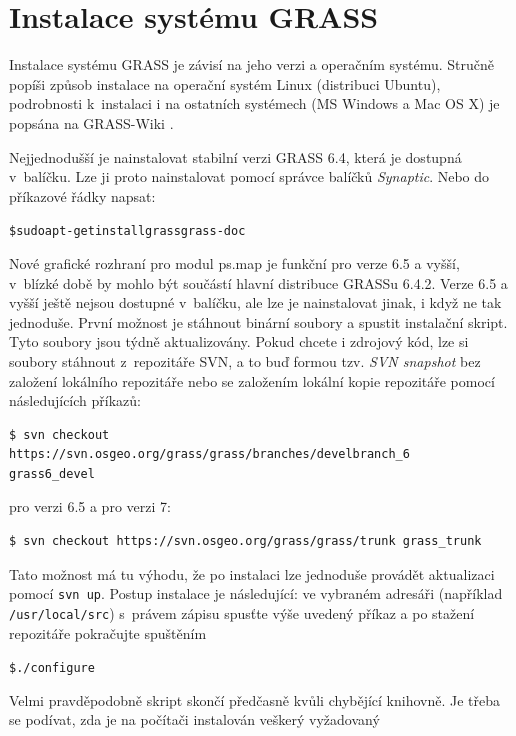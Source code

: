 \documentclass[a4paper,12pt,draft]{article}
\newif\ifbc %
\begin{document}
\newpage
\appendix
\pagestyle{plain}
\ifbc
\section{Instalace systému GRASS}
\label{priloha:instalace}
Instalace systému GRASS je závisí na jeho verzi a operačním
systému. Stručně popíši způsob instalace na operační systém Linux
(distribuci Ubuntu), podrobnosti k~instalaci i na ostatních systémech
(MS Windows a Mac OS X) je popsána na GRASS-Wiki \cite{instalace}.

Nejjednodušší je nainstalovat stabilní verzi GRASS 6.4, která je
dostupná v~ba\-líčku. Lze ji proto nainstalovat pomocí správce balíčků
\emph{Synaptic}. Nebo do příkazové řádky napsat:
\begin{alltt}
{\footnotesize \$ sudo apt-get install grass grass-doc}
\end{alltt}

Nové grafické rozhraní pro modul ps.map je funkční pro verze 6.5
a vyšší, v~blízké době by mohlo být součástí hlavní distribuce GRASSu 6.4.2.
Verze 6.5 a vyšší ještě nejsou dostupné v~balíčku, ale lze je nainstalovat
jinak,
i když ne tak jednoduše. První možnost je stáhnout binární soubory  a
spustit instalační skript. Tyto soubory jsou týdně aktualizovány. Pokud
chcete i zdrojový kód, lze si soubory stáhnout z~repozitáře SVN, a to buď
formou tzv. \emph{SVN snapshot} bez založení lokálního repozitáře nebo
se založením lokální kopie repozitáře pomocí následujících příkazů:
\begin{footnotesize}
\begin{verbatim}
$ svn checkout https://svn.osgeo.org/grass/grass/branches/develbranch_6
grass6_devel
\end{verbatim}
\end{footnotesize}
pro verzi 6.5 a pro verzi 7:
\begin{footnotesize}
\begin{verbatim}
$ svn checkout https://svn.osgeo.org/grass/grass/trunk grass_trunk
\end{verbatim}
\end{footnotesize}
Tato možnost má tu výhodu, že po instalaci lze jednoduše provádět
aktualizaci pomocí \verb|svn up|. Postup instalace je následující: ve
vybraném adresáři (například \verb|/usr/local/src|) s~právem zápisu
spusťte výše uvedený příkaz a po stažení repozitáře pokračujte
spuštěním
\begin{alltt}
{\footnotesize \$ ./configure}
\end{alltt}
Velmi pravděpodobně skript skončí předčasně
kvůli chybějící knihovně. Je třeba se podívat,
zda je na počítači instalován veškerý vyžadovaný
\end{document}
